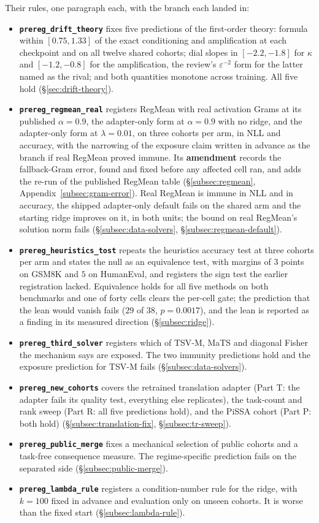 Their rules, one paragraph each, with the branch each landed in:
\begin{itemize}\itemsep2pt
\item \textbf{\texttt{prereg\_drift\_theory}} fixes five predictions of the
first-order theory: formula within $[0.75, 1.33]$ of the exact conditioning and
amplification at each checkpoint and on all twelve shared cohorts; dial slopes
in $[-2.2, -1.8]$ for $\kappa$ and $[-1.2, -0.8]$ for the amplification, the
review's $\varepsilon^{-2}$ form for the latter named as the rival; and both
quantities monotone across training. All five hold (\S\ref{sec:drift-theory}).
\item \textbf{\texttt{prereg\_regmean\_real}} registers RegMean with real
activation Grams at its published $\alpha = 0.9$, the adapter-only form at
$\alpha = 0.9$ with no ridge, and the adapter-only form at $\lambda = 0.01$, on
three cohorts per arm, in NLL and accuracy, with the narrowing of the exposure
claim written in advance as the branch if real RegMean proved immune. Its
\textbf{amendment} records the fallback-Gram error, found and fixed before any
affected cell ran, and adds the re-run of the published RegMean table
(\S\ref{subsec:regmean}, Appendix~\ref{subsec:gram-error}). Real RegMean is
immune in NLL and in accuracy, the shipped adapter-only default fails on the
shared arm and the starting ridge improves on it, in both units; the bound on
real RegMean's solution norm fails (\S\ref{subsec:data-solvers},
\S\ref{subsec:regmean-default}).
\item \textbf{\texttt{prereg\_heuristics\_tost}} repeats the heuristics
accuracy test at three cohorts per arm and states the null as an equivalence
test, with margins of $3$ points on GSM8K and $5$ on HumanEval, and registers
the sign test the earlier registration lacked. Equivalence holds for all five
methods on both benchmarks and one of forty cells clears the per-cell gate; the
prediction that the lean would vanish fails ($29$ of $38$, $p = 0.0017$), and
the lean is reported as a finding in its measured direction
(\S\ref{subsec:ridge}).
\item \textbf{\texttt{prereg\_third\_solver}} registers which of TSV-M, MaTS
and diagonal Fisher the mechanism says are exposed. The two immunity predictions
hold and the exposure prediction for TSV-M fails (\S\ref{subsec:data-solvers}).
\item \textbf{\texttt{prereg\_new\_cohorts}} covers the retrained translation
adapter (Part T: the adapter fails its quality test, everything else
replicates), the task-count and rank sweep (Part R: all five predictions
hold), and the PiSSA cohort (Part P: both hold)
(\S\ref{subsec:translation-fix}, \S\ref{subsec:tr-sweep}).
\item \textbf{\texttt{prereg\_public\_merge}} fixes a mechanical selection of
public cohorts and a task-free consequence measure. The regime-specific
prediction fails on the separated side (\S\ref{subsec:public-merge}).
\item \textbf{\texttt{prereg\_lambda\_rule}} registers a condition-number rule
for the ridge, with $k = 100$ fixed in advance and evaluation only on unseen
cohorts. It is worse than the fixed start (\S\ref{subsec:lambda-rule}).
\end{itemize}
